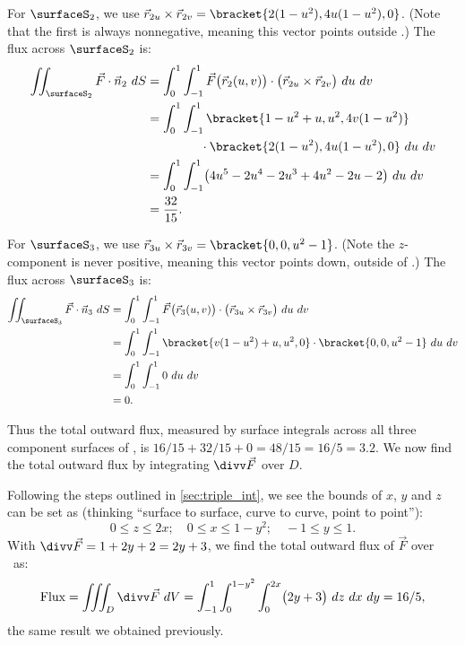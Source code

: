\begin{example}
For $\surfaceS_2$, we use $\vec r_{2u}\times\vec r_{2v} =\bracket{2(1-u^2), 4u(1-u^2),0}$. (Note that the first is always nonnegative, meaning this vector points outside \surfaceS.) The flux across $\surfaceS_2$ is:
\begin{align*}
	\iint_{\surfaceS_2} \vec F\cdot \vec n_2\ dS
	&= \int_0^1\int_{-1}^1 \vec F\bigl(\vec r_2(u,v)\bigr)\cdot \bigl(\vec r_{2u}\times\vec r_{2v}\bigr)\ du\ dv\\
	&= \int_0^1\int_{-1}^1\bracket{1-u^2+u, u^2, 4v(1-u^2)}\\
	&\hphantom{=\int_0^1\int_{-1}^1}\cdot\bracket{2(1-u^2), 4u(1-u^2),0}\ du\ dv\\
	&= \int_0^1\int_{-1}^1 \bigl(4u^5-2u^4-2u^3+4u^2-2u-2\bigr)\ du\ dv\\
	&= \frac{32}{15}.
\end{align*}

For $\surfaceS_3$, we use $\vec r_{3u}\times\vec r_{3v} =\bracket{0,0,u^2-1}$. (Note the $z$-component is never positive, meaning this vector points down, outside of \surfaceS.) The flux across $\surfaceS_3$ is:
\begin{align*}
	\iint_{\surfaceS_3} \vec F\cdot \vec n_3\ dS
	&= \int_0^1\int_{-1}^1 \vec F\bigl(\vec r_3(u,v)\bigr)\cdot \bigl(\vec r_{3u}\times\vec r_{3v}\bigr)\ du\ dv\\
	&= \int_0^1\int_{-1}^1\bracket{v(1-u^2)+u,u^2,0}\cdot\bracket{0,0,u^2-1}\ du\ dv\\
	&= \int_0^1\int_{-1}^1 0\ du\ dv\\
	&= 0.
\end{align*}

Thus the total outward flux, measured by surface integrals across all three component surfaces of \surfaceS, is $16/15+32/15+0 = 48/15 = 16/5 = 3.2$. We now find the total outward flux by integrating $\divv \vec F$ over $D$.

Following the steps outlined in \autoref{sec:triple_int}, we see the bounds of $x$, $y$ and $z$ can be set as (thinking ``surface to surface, curve to curve, point to point''):
\[0\leq z\leq 2x;\quad 0\leq x\leq 1-y^2;\quad -1\leq y\leq 1.\]
With $\divv \vec F = 1+2y+2 = 2y+3$, we find the total outward flux of $\vec F$ over \surfaceS\ as:
\[
\text{Flux} = \iiint_D\divv \vec F\ dV
= \int_{-1}^1\int_0^{1-y^2}\int_0^{2x}\bigl(2y+3\bigr)\ dz\ dx\ dy = 16/5,
\]
the same result we obtained previously.
\end{example}

